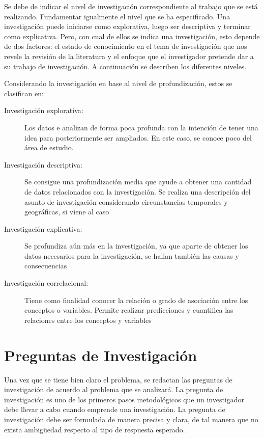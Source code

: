 \documentclass[12]{plan_tesis}
\begin{document}
Se debe de indicar el nivel de investigación correspondiente al trabajo que se está realizando. Fundamentar igualmente el nivel que se ha especificado. Una investigación puede iniciarse como explorativa, luego ser descriptiva y terminar como explicativa. Pero, con cual de ellos se indica una investigación, esto depende de dos factores: el estado de conocimiento en el tema de investigación que nos revele la revisión de la literatura y el enfoque que el investigador pretende dar a su trabajo de investigación.  A continuación se describen los diferentes niveles.\newline

Considerando la investigación en base al nivel de profundización, estos se clasifican en:

\begin{description}

    \item[Investigación explorativa:] Los datos e analizan de forma poca profunda con la intención de tener una idea para posteriormente ser ampliados. En este caso, se conoce poco del área de estudio.

    \item[Investigación descriptiva:] Se consigue una profundización media que ayude a obtener una cantidad de datos relacionados con la investigación. Se realiza una descripción del asunto de investigación considerando circunstancias temporales y geográficas, si viene al caso
    
    \item[Investigación explicativa:] Se profundiza aún más en la investigación, ya que aparte de obtener los datos necesarios para la investigación, se hallan también las causas y consecuencias
    
    \item[Investigación correlacional:] Tiene como finalidad conocer la relación o grado de asociación entre los conceptos o variables. Permite realizar predicciones y cuantifica las relaciones entre los conceptos y variables

\end{description}

\section{Preguntas de Investigación}
Una vez que se tiene bien claro el problema, se redactan las preguntas de investigación de acuerdo al problema que se analizará. La pregunta de investigación es uno de los primeros pasos metodológicos que un investigador debe llevar a cabo cuando emprende una investigación.
La pregunta de investigación debe ser formulada de manera precisa y clara, de tal manera que no exista ambigüedad respecto al tipo de respuesta esperado.\newline
\end{document}
